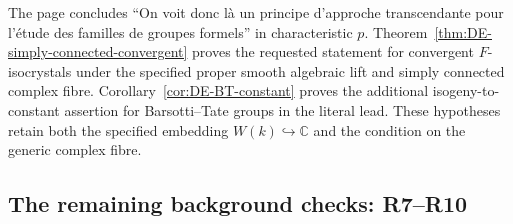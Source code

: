 \begin{remark}\label{rem:DE-quote-E11}
The page concludes ``On voit donc là un principe d'approche transcendante pour l'étude des familles de groupes formels'' in characteristic $p$.  Theorem~\ref{thm:DE-simply-connected-convergent} proves the requested statement for convergent $F$-isocrystals under the specified proper smooth algebraic lift and simply connected complex fibre.  Corollary~\ref{cor:DE-BT-constant} proves the additional isogeny-to-constant assertion for Barsotti--Tate groups in the literal lead.  These hypotheses retain both the specified embedding $W(k)\hookrightarrow\mathbb C$ and the condition on the generic complex fibre.
\end{remark}

\subsection{The remaining background checks: R7--R10}


